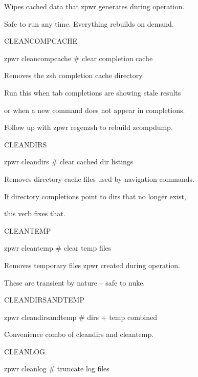 \documentclass[11pt,a4paper,twoside]{book}
\begin{document}
Wipes cached data that zpwr generates during operation.

Safe to run any time. Everything rebuilds on demand.

CLEANCOMPCACHE

\begin{codebox}
zpwr cleancompcache                 \# clear completion cache\\
\end{codebox}

Removes the zsh completion cache directory.

Run this when tab completions are showing stale results

or when a new command does not appear in completions.

\begin{codebox}
Follow up with zpwr regenzsh to rebuild zcompdump.\\
\end{codebox}

CLEANDIRS

\begin{codebox}
zpwr cleandirs                      \# clear cached dir listings\\
\end{codebox}

Removes directory cache files used by navigation commands.

If directory completions point to dirs that no longer exist,

this verb fixes that.

CLEANTEMP

\begin{codebox}
zpwr cleantemp                      \# clear temp files\\
\end{codebox}

Removes temporary files zpwr created during operation.

These are transient by nature -- safe to nuke.

CLEANDIRSANDTEMP

\begin{codebox}
zpwr cleandirsandtemp               \# dirs + temp combined\\
\end{codebox}

Convenience combo of cleandirs and cleantemp.

CLEANLOG

\begin{codebox}
zpwr cleanlog                       \# truncate log files\\
\end{codebox}
\end{document}
